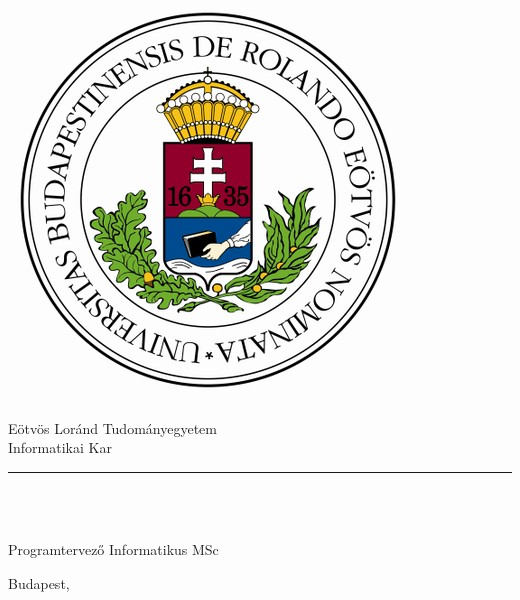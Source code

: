 \begin{titlepage}

\begin{minipage}{0.40\linewidth}
\includegraphics[scale=0.3]{img/elte-cimer}
\end{minipage}
\begin{minipage}{0.50\linewidth}
\begin{center}
Eötvös Loránd Tudományegyetem \\
Informatikai Kar \\
\TANSZEK
\end{center}
\end{minipage}

\hrule
\vfill

\begin{center}
\Huge
\textbf{\CIM}
\normalsize
\end{center}

\vfill

\begin{minipage}[t]{0.5\linewidth}
\begin{flushleft}
\textbf{\TEMAVEZETO} \\
\TEMAVEZETOBEOSZTAS
\end{flushleft}
\end{minipage}
\begin{minipage}[t]{0.5\linewidth}
\begin{flushright}
\textbf{\SZERZO} \\
Programtervező Informatikus MSc
\end{flushright}
\end{minipage}

\vfill

\begin{center}
Budapest, \VEDESEVE
\end{center}

\end{titlepage}
